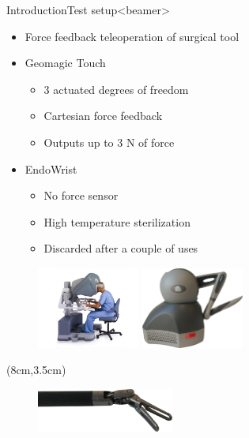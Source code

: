 \begin{frame}{Introduction}{Test setup}<beamer>
\begin{itemize}
\item Force feedback teleoperation of surgical tool
\item Geomagic Touch 
\begin{itemize}
\item 3 actuated degrees of freedom 
\item Cartesian force feedback
\item Outputs up to 3 N of force
\end{itemize}
\item EndoWrist
\begin{itemize}
	\item No force sensor
	\item High temperature sterilization
	\item Discarded after a couple of uses
\end{itemize}
\end{itemize}

\begin{figure}
	\includegraphics[width=0.3\textwidth]{Billeder/Dan/console.jpg}
	\resizebox{0.1\textwidth}{0.05\textwidth}{$\Rightarrow $}
	\includegraphics[width=0.3\textwidth]{Billeder/GT.png}
\end{figure}

\begin{textblock*}{0.7\textwidth}(8cm,3.5cm) %
	\begin{figure}[H]
		\centering
		\centering
		\includegraphics[width=0.4\textwidth]{Billeder/endo2.png}
	\end{figure}
\end{textblock*}


\end{frame}

